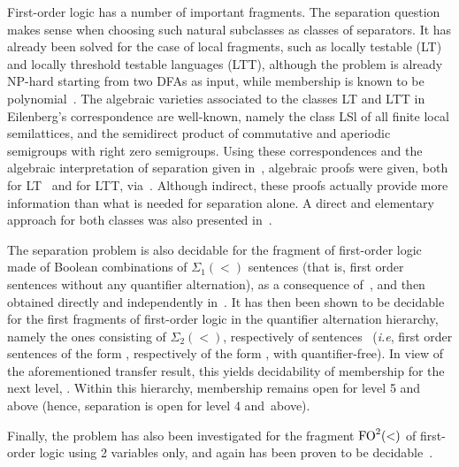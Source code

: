 \documentclass{CSML}
\newcommand{\siw}{\ensuremath{\Sigma_{2}(<)}\xspace}
\newcommand{\siu}{\ensuremath{\Sigma_{1}(<)}\xspace}
\newcommand\fodw{\ensuremath{\textup{FO}^2(<)}\xspace}
\theoremstyle{plain}
\begin{document}
\medskip{} First-order logic has a number of
important fragments. The separation question makes sense when choosing such
natural subclasses as classes of separators. It has already been solved for
the case of local fragments, such as locally testable (LT) and locally
threshold testable languages (LTT), although the problem is already NP-hard
starting from two DFAs as input, while membership is known to be
polynomial~\cite{Beauquier&Pin:Languages-scanners:1991:a}. The algebraic
varieties associated to the classes LT and LTT in Eilenberg's correspondence
are well-known, namely the class \textsf{LSl} of all finite local
semilattices, and the semidirect product  of
commutative and aperiodic semigroups with right zero semigroups. Using these
correspondences and the algebraic interpretation of separation given
in~\cite{MR1709911}, algebraic proofs were given, both for
LT~\cite{Costa&Nogueira:Complete-reducibility-pseudovariety:2009:a,Costa:Free-profinite-locally-idempotent:2001:a}
and for
LTT, via~\cite{Beauquier&Pin:Languages-scanners:1991:a,Straubing:Finite-semigroup-varieties-form:1985:a,Steinberg:98,Steinberg:01}.
Although indirect, these proofs actually provide more information than what is
needed for separation alone. A direct and elementary approach for both classes
was also presented in~\cite{ltltt:2013,PvRZ:LTT:14}.

The separation problem is also decidable for the fragment of first-order logic made of Boolean
combinations of \siu sentences (that is, first order sentences without any
quantifier alternation), as a consequence of~\cite{MR1709911,AZ97-J}, and then
obtained directly and independently in~\cite{sep_icalp13,PvRZ:mfcs}. It has then been shown to be decidable for
the first fragments of first-order logic in the quantifier alternation
hierarchy, namely the ones consisting of \siw\cite{PZ:icalp14}, respectively
of  sentences~\cite{pseps3} (\emph{i.e}, first order sentences
of the form , respectively of the form
, with  quantifier-free). In view
of the aforementioned transfer result, this yields decidability
of membership for the next level, . Within this hierarchy,
membership remains open for level 5 and above (hence, separation is open
for level 4 and~above).

Finally, the problem has also been
investigated for the fragment \fodw of first-order logic using 2 variables
only, and again has been proven to be decidable~\cite{PvRZ:mfcs}.
\end{document}
